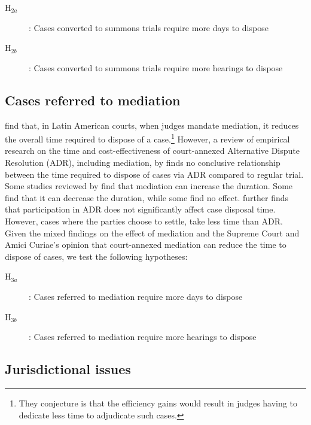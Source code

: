 \documentclass[12pt,a4paper]{article}
\begin{document}
\begin{description}
\item[H$_{2a}$]: Cases converted to summons trials require more days to dispose
\item[H$_{2b}$]: Cases converted to summons trials require more hearings to dispose
\end{description}

\subsection{Cases referred to mediation} \label{sec:furth-exam-cases}

\textcite{buscaglia1997_latinAmericaCourtDelays} find that, in Latin American courts, when judges mandate mediation, it reduces the overall time required to dispose of a case.\footnote{They conjecture is that the efficiency gains would result in judges having to dedicate less time to adjudicate such cases.} However, a review of empirical research on the time and cost-effectiveness of court-annexed Alternative Dispute Resolution (ADR), including mediation, by \textcite{wissler2004effectiveness} finds no conclusive relationship between the time required to dispose of cases via ADR compared to regular trial. Some studies reviewed by \textcite{wissler2004effectiveness} find that mediation can increase the duration. Some find that it can decrease the duration, while some find no effect. \textcite{heise2010adr} further finds that participation in ADR does not significantly affect case disposal time. However, cases where the parties choose to settle, take less time than ADR. Given the mixed findings on the effect of mediation and the Supreme Court and Amici Curiae's opinion that court-annexed mediation can reduce the time to dispose of cases, we test the following hypotheses:

\begin{description}
\item[H$_{3a}$]: Cases referred to mediation require more days to dispose
\item[H$_{3b}$]: Cases referred to mediation require more hearings to dispose
\end{description}

\subsection{Jurisdictional issues}
\end{document}

